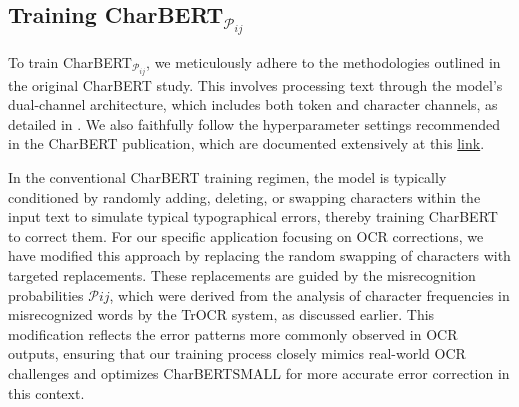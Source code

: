 \subsection{Training CharBERT$_{\mathcal{P}_{ij}}$}
\label{subsec:3_training_charbert_pij}
To train CharBERT$_{\mathcal{P}_{ij}}$, we meticulously adhere to the methodologies outlined in the original CharBERT study. This involves processing text through the model's dual-channel architecture, which includes both token and character channels, as detailed in . We also faithfully follow the hyperparameter settings recommended in the CharBERT publication, which are documented extensively at this \href{https://github.com/mawentao277/CharBERT}{link}.

In the conventional CharBERT training regimen, the model is typically conditioned by randomly adding, deleting, or swapping characters within the input text to simulate typical typographical errors, thereby training CharBERT to correct them. For our specific application focusing on OCR corrections, we have modified this approach by replacing the random swapping of characters with targeted replacements. These replacements are guided by the misrecognition probabilities $\mathcal{P}{ij}$, which were derived from the analysis of character frequencies in misrecognized words by the TrOCR system, as discussed earlier. This modification reflects the error patterns more commonly observed in OCR outputs, ensuring that our training process closely mimics real-world OCR challenges and optimizes CharBERT${\text{SMALL}}$ for more accurate error correction in this context.